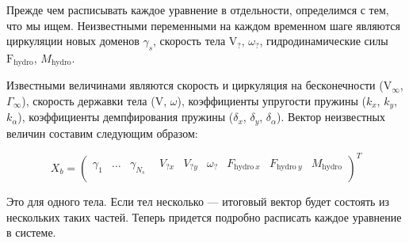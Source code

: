 \documentclass[a4paper,14pt]{extreport}
\newcommand{\br}[1]{\boldsymbol{\mathrm{#1}}}
\renewcommand{\vec}[1]{\br{#1}}
\newenvironment{packed_enum}{
\begin{enumerate}
  \setlength{\itemsep}{1pt}
  \setlength{\parskip}{0pt}
  \setlength{\parsep}{0pt}
}{\end{enumerate}}
\begin{document}

Прежде чем расписывать каждое уравнение в отдельности, определимся с тем, что мы ищем. Неизвестными переменными на каждом временном шаге являются циркуляции новых доменов $\gamma_s$, скорость тела $\vec V_?$, $\omega_?$, гидродинамические силы $\vec F_\text{hydro}$, $M_\text{hydro}$.

Известными величинами являются скорость и циркуляция на бесконечности ($\vec V_\infty$, $\Gamma_\infty$), скорость державки тела ($\vec V$, $\omega$), коэффициенты упругости пружины ($k_x$, $k_y$, $k_\alpha$), коэффициенты демпфирования пружины ($\delta_x$, $\delta_y$, $\delta_\alpha$). Вектор неизвестных величин составим следующим образом:

\begin{equation}
\label{eq_5_3_1}
X_b =
\left(\begin{matrix}
\gamma_1 & \dotsc & \gamma_{N_s}& ~~V_{?x}& V_{?y}& \omega_?& F_{\text{hydro}~x}& F_{\text{hydro}~y} &M_\text{hydro}\\
\end{matrix}\right)^T
\end{equation}

Это для одного тела. Если тел несколько --- итоговый вектор будет состоять из нескольких таких частей. Теперь придется подробно расписать каждое уравнение в системе. 

\end{document}
